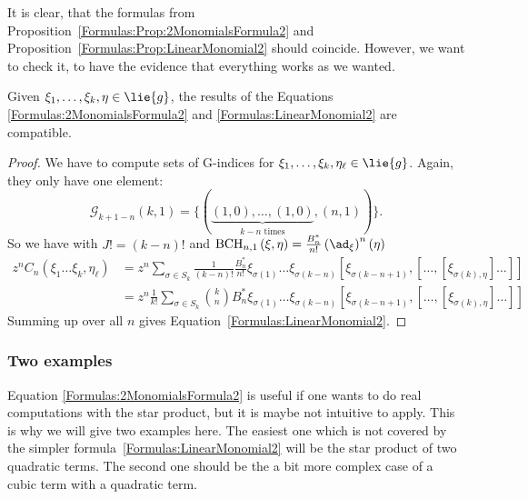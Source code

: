 It is clear, that the formulas from 
Proposition~\ref{Formulas:Prop:2MonomialsFormula2} and 
Proposition~\ref{Formulas:Prop:LinearMonomial2} should coincide. However, 
we want to check it, to have the evidence that everything works as we wanted.
\begin{corollary}
	\label{Formulas:Cor:FormulasCoincide}
	Given $\xi_1, \ldots, \xi_k, \eta \in \lie{g}$, the results of the 
	Equations \eqref{Formulas:2MonomialsFormula2} and 
	\eqref{Formulas:LinearMonomial2} are compatible.
\end{corollary}
\begin{proof}
	We have to compute sets of G-indices for $\xi_1, \ldots, \xi_k, 
	\eta_{\ell} \in \lie{g}$. Again, they only have one element:
	\begin{equation*}
		\mathcal{G}_{k + 1 - n}(k, 1)
		=
		\Big\{
			( 
				\underbrace{(1,0), \ldots, (1,0)}_{
				k - n \text{ times}
				}
				,
				(n,1)
			)
		\Big\}.
	\end{equation*}
	So we have with $J! = (k - n)!$ and $\bchparts{n}{1}{\xi}{\eta} = 
	\frac{B_n^*}{n!} \left( \ad_{\xi} \right)^n (\eta)$
	\begin{align*}
		z^n C_n
		\left(
			\xi_1 \ldots \xi_k, \eta_{\ell}
		\right)
		& =
		z^n
		\sum\limits_{\sigma \in S_k}
		\frac{1}{(k - n)!}
		\frac{B_n^*}{n!}
		\xi_{\sigma(1)} \ldots \xi_{\sigma(k-n)}
		[\xi_{\sigma(k-n+1)}, [
			\ldots, [\xi_{\sigma(k), \eta} ] \ldots 
		]]
		\\
		& =
		z^n
		\frac{1}{k!}
		\sum\limits_{\sigma \in S_k}
		\binom{k}{n} B_n^*
		\xi_{\sigma(1)} \ldots \xi_{\sigma(k-n)}
		[\xi_{\sigma(k-n+1)}, [
			\ldots, [\xi_{\sigma(k), \eta} ] \ldots 
		]]		
	\end{align*}
	Summing up over all $n$ gives Equation~\eqref{Formulas:LinearMonomial2}.
\end{proof}



\subsubsection*{Two examples}
Equation \eqref{Formulas:2MonomialsFormula2} is useful if one wants to do 
real computations with the star product, but it is maybe not intuitive to 
apply. This is why we will give two examples here. The easiest one which is 
not covered by the simpler formula~\eqref{Formulas:LinearMonomial2} will be 
the star product of two quadratic terms. The second one should be the a bit 
more complex case of a cubic term with a quadratic term.

